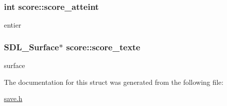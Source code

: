 \subsubsection[{\texorpdfstring{score\+\_\+atteint}{score_atteint}}]{\setlength{\rightskip}{0pt plus 5cm}int score\+::score\+\_\+atteint}\hypertarget{structscore_a86ee1f22a5bf4e92781f2b2165aa0859}{}\label{structscore_a86ee1f22a5bf4e92781f2b2165aa0859}
entier 
\subsubsection[{\texorpdfstring{score\+\_\+texte}{score_texte}}]{\setlength{\rightskip}{0pt plus 5cm}S\+D\+L\+\_\+\+Surface$\ast$ score\+::score\+\_\+texte}\hypertarget{structscore_aa5918332d1797da4bedaccfce5446b88}{}\label{structscore_aa5918332d1797da4bedaccfce5446b88}
surface 

The documentation for this struct was generated from the following file\+:\begin{DoxyCompactItemize}
\item 
\hyperlink{save_8h}{save.\+h}\end{DoxyCompactItemize}
